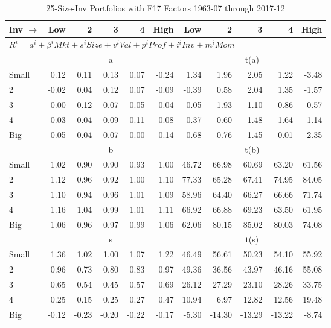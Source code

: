 
\begin{table}[!ht]
\footnotesize
\centering
\caption{25-Size-Inv Portfolios with F17 Factors 1963-07 through 2017-12}
\begin{tabular}{lrrrrrrrrrr}
  \toprule
    
    Inv $\rightarrow$ & Low & 2 & 3 & 4 & High & Low & 2 & 3 & 4 & High  \\ 
  \midrule
  \multicolumn{11}{l}{$R^i=a^i+\beta^iMkt+s^iSize+v^iVal+p^iProf+i^iInv+m^iMom$}  \\
  
     & \multicolumn{5}{c}{a} & \multicolumn{5}{c}{t(a)}   \\
     \cmidrule(r){2-6} \cmidrule(r){7-11} 
    Small  & 0.12  & 0.11  & 0.13  & 0.07  & -0.24  & 1.34  & 1.96  & 2.05  & 1.22  & -3.48   \\
    2  & -0.02  & 0.04  & 0.12  & 0.07  & -0.09  & -0.39  & 0.58  & 2.04  & 1.35  & -1.57   \\
    3  & 0.00  & 0.12  & 0.07  & 0.05  & 0.04  & 0.05  & 1.93  & 1.10  & 0.86  & 0.57   \\
    4  & -0.03  & 0.04  & 0.09  & 0.11  & 0.08  & -0.37  & 0.60  & 1.48  & 1.64  & 1.14   \\
    Big  & 0.05  & -0.04  & -0.07  & 0.00  & 0.14  & 0.68  & -0.76  & -1.45  & 0.01  & 2.35   \\
    
  
     & \multicolumn{5}{c}{b} & \multicolumn{5}{c}{t(b)}   \\
     \cmidrule(r){2-6} \cmidrule(r){7-11} 
    Small  & 1.02  & 0.90  & 0.90  & 0.93  & 1.00  & 46.72  & 66.98  & 60.69  & 63.20  & 61.56   \\
    2  & 1.12  & 0.96  & 0.92  & 1.00  & 1.10  & 77.33  & 65.28  & 67.41  & 74.95  & 84.05   \\
    3  & 1.10  & 0.94  & 0.96  & 1.01  & 1.09  & 58.96  & 64.40  & 66.27  & 66.66  & 71.74   \\
    4  & 1.16  & 1.04  & 0.99  & 1.01  & 1.11  & 66.92  & 66.88  & 69.23  & 63.50  & 61.95   \\
    Big  & 1.06  & 0.96  & 0.97  & 0.99  & 1.06  & 62.06  & 80.15  & 85.02  & 80.03  & 74.08   \\
    
  
     & \multicolumn{5}{c}{s} & \multicolumn{5}{c}{t(s)}   \\
     \cmidrule(r){2-6} \cmidrule(r){7-11} 
    Small  & 1.36  & 1.02  & 1.00  & 1.07  & 1.22  & 46.49  & 56.61  & 50.23  & 54.10  & 55.92   \\
    2  & 0.96  & 0.73  & 0.80  & 0.83  & 0.97  & 49.36  & 36.56  & 43.97  & 46.16  & 55.08   \\
    3  & 0.65  & 0.54  & 0.45  & 0.57  & 0.69  & 26.12  & 27.29  & 23.10  & 28.26  & 33.75   \\
    4  & 0.25  & 0.15  & 0.25  & 0.27  & 0.47  & 10.94  & 6.97  & 12.82  & 12.56  & 19.48   \\
    Big  & -0.12  & -0.23  & -0.20  & -0.22  & -0.17  & -5.30  & -14.30  & -13.29  & -13.22  & -8.74   \\
    

\end{tabular}
\end{table}
